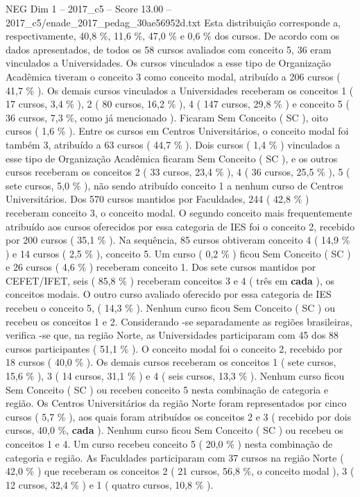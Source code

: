 \begin{textsample}{NEG Dim 1 – 2017\_c5 – Score 13.00 – 2017\_c5/enade\_2017\_pedag\_30ae56952d.txt}
Esta distribuição corresponde a, respectivamente, 40,8 \%, 11,6 \%, 47,0 \% e 0,6 \% dos cursos.
De acordo com os dados apresentados, de todos os 58 cursos avaliados com conceito 5, 36 eram vinculados a Universidades.
Os cursos vinculados a esse tipo de Organização Acadêmica tiveram o conceito 3 como conceito modal, atribuído a 206 cursos ( 41,7 \% ).
Os demais cursos vinculados a Universidades receberam os conceitos 1 ( 17 cursos, 3,4 \% ), 2 ( 80 cursos, 16,2 \% ), 4 ( 147 cursos, 29,8 \% ) e conceito 5 ( 36 cursos, 7,3 \%, como já mencionado ).
Ficaram Sem Conceito ( SC ), oito cursos ( 1,6 \% ).
Entre os cursos em Centros Universitários, o conceito modal foi também 3, atribuído a 63 cursos ( 44,7 \% ).
Dois cursos ( 1,4 \% ) vinculados a esse tipo de Organização Acadêmica ficaram Sem Conceito ( SC ), e os outros cursos receberam os conceitos 2 ( 33 cursos, 23,4 \% ), 4 ( 36 cursos, 25,5 \% ), 5 ( sete cursos, 5,0 \% ), não sendo atribuído conceito 1 a nenhum curso de Centros Universitários.
Dos 570 cursos mantidos por Faculdades, 244 ( 42,8 \% ) receberam conceito 3, o conceito modal.
O segundo conceito mais frequentemente atribuído aos cursos oferecidos por essa categoria de IES foi o conceito 2, recebido por 200 cursos ( 35,1 \% ).
Na sequência, 85 cursos obtiveram conceito 4 ( 14,9 \% ) e 14 cursos ( 2,5 \% ), conceito 5.
Um curso ( 0,2 \% ) ficou Sem Conceito ( SC ) e 26 cursos ( 4,6 \% ) receberam conceito 1.
Dos sete cursos mantidos por CEFET/IFET, seis ( 85,8 \% ) receberam conceitos 3 e 4 ( três em \textbf{cada} ), os conceitos modais.
O outro curso avaliado oferecido por essa categoria de IES recebeu o conceito 5, ( 14,3 \% ).
Nenhum curso ficou Sem Conceito ( SC ) ou recebeu os conceitos 1 e 2.
Considerando -se separadamente as regiões brasileiras, verifica -se que, na região Norte, as Universidades participaram com 45 dos 88 cursos participantes ( 51,1 \% ).
O conceito modal foi o conceito 2, recebido por 18 cursos ( 40,0 \% ).
Os demais cursos receberam os conceitos 1 ( sete cursos, 15,6 \% ), 3 ( 14 cursos, 31,1 \% ) e 4 ( seis cursos, 13,3 \% ).
Nenhum curso ficou Sem Conceito ( SC ) ou recebeu conceito 5 nesta combinação de categoria e região.
Os Centros Universitários da região Norte foram representados por cinco cursos ( 5,7 \% ), aos quais foram atribuídos os conceitos 2 e 3 ( recebido por dois cursos, 40,0 \%, \textbf{cada} ).
Nenhum curso ficou Sem Conceito ( SC ) ou recebeu os conceitos 1 e 4.
Um curso recebeu conceito 5 ( 20,0 \% ) nesta combinação de categoria e região.
As Faculdades participaram com 37 cursos na região Norte ( 42,0 \% ) que receberam os conceitos 2 ( 21 cursos, 56,8 \%, o conceito modal ), 3 ( 12 cursos, 32,4 \% ) e 1 ( quatro cursos, 10,8 \% ).

\end{textsample}
